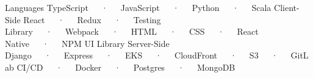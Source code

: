 

\begin{cvtechnicals}
  \cvtechnical %
  {Languages} %
  {TypeScript~~~·~~~JavaScript~~~·~~~Python~~~·~~~Scala} %
  {Client-Side} %
  {React~~~·~~~Redux~~~·~~~Testing Library~~~·~~~Webpack~~~·~~~HTML~~~·~~~CSS~~~·~~~React Native~~~·~~~NPM UI Library} %
  {Server-Side} %
  {Django~~~·~~~Express~~~·~~~EKS~~~·~~~CloudFront~~~·~~~S3~~~·~~~GitLab CI/CD~~~·~~~Docker~~~·~~~Postgres~~~·~~~MongoDB} %
\end{cvtechnicals}